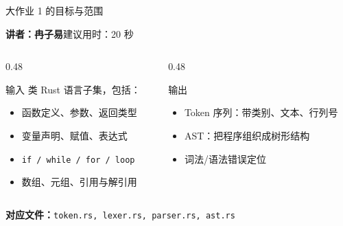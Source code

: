 \documentclass[aspectratio=169]{ctexbeamer}
\newcommand{\speaker}[2]{%
    \vspace{-0.4em}
    \begin{flushright}
        \scriptsize\color{mainblue}\textbf{讲者：#1}\quad 建议用时：#2
    \end{flushright}
    \vspace{-0.7em}
}
\begin{document}
\begin{frame}{大作业 1 的目标与范围}
    \speaker{冉子易}{20 秒}
    \begin{columns}[T]
    \begin{column}{0.48\textwidth}
        \begin{block}{输入}
            类 Rust 语言子集，包括：
            \begin{itemize}
                \item 函数定义、参数、返回类型
                \item 变量声明、赋值、表达式
                \item \texttt{if / while / for / loop}
                \item 数组、元组、引用与解引用
            \end{itemize}
        \end{block}
    \end{column}
    \begin{column}{0.48\textwidth}
        \begin{block}{输出}
            \begin{itemize}
                \item Token 序列：带类别、文本、行列号
                \item AST：把程序组织成树形结构
                \item 词法/语法错误定位
            \end{itemize}
        \end{block}
    \end{column}
    \end{columns}
    \vspace{0.5em}
    \textbf{对应文件：}\texttt{token.rs, lexer.rs, parser.rs, ast.rs}
\end{frame}
\end{document}

